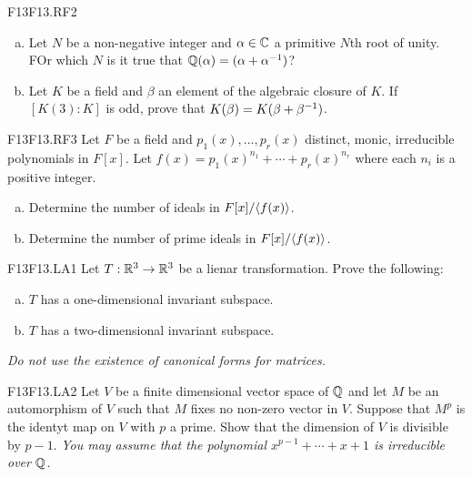 \documentclass[../AlgebraQualSolutions.tex]{subfiles}
\begin{document}
	\begin{prob}{F13}{F13.RF2}

		\begin{enumerate}[(a)]
			\item Let $N$ be a non-negative integer and $\alpha \in \mathbb{C}$ a primitive $N$th root of unity. FOr which $N$ is it true that $\mathbb{Q}(\alpha) = (\alpha + \alpha^{-1})$?
			\item Let $K$ be a field and $\beta$ an element of the algebraic closure of $K$. If $[K(3):K]$ is odd, prove that $K(\beta) = K(\beta + \beta^{-1})$.
		\end{enumerate}
	\end{prob}

	\begin{prob}{F13}{F13.RF3}
		Let $F$ be a field and $p_1(x), \ldots, p_r(x)$ distinct, monic, irreducible polynomials in $F[x]$. Let $f(x) = p_1(x)^{n_1} + \cdots + p_r(x)^{n_r}$ where each $n_i$ is a positive integer.

		\begin{enumerate}[(a)]
			\item Determine the number of ideals in $F[x]/\langle f(x) \rangle$.
			\item Determine the number of prime ideals in $F[x]/\langle f(x) \rangle$.
		\end{enumerate}
	\end{prob}

	\begin{prob}{F13}{F13.LA1}
		Let $T: \mathbb{R}^3 \to \mathbb{R}^3$ be a lienar transformation. Prove the following:
		\begin{enumerate}[(a)]
			\item $T$ has a one-dimensional invariant subspace.
			\item $T$ has a two-dimensional invariant subspace.
		\end{enumerate}

		\emph{ Do not use the existence of canonical forms for matrices.}
	\end{prob}

	\begin{prob}{F13}{F13.LA2}
		Let $V$ be a finite dimensional vector space of $\mathbb{Q}$ and let $M$ be an automorphism of $V$ such that $M$ fixes no non-zero vector in $V$. Suppose that $M^p$ is the identyt map on $V$ with $p$ a prime. Show that the dimension of $V$ is divisible by $p-1$. \emph{ You may assume that the polynomial $x^{p-1} + \cdots + x + 1$ is irreducible  over $\mathbb{Q}$.}
	\end{prob}
\end{document}
